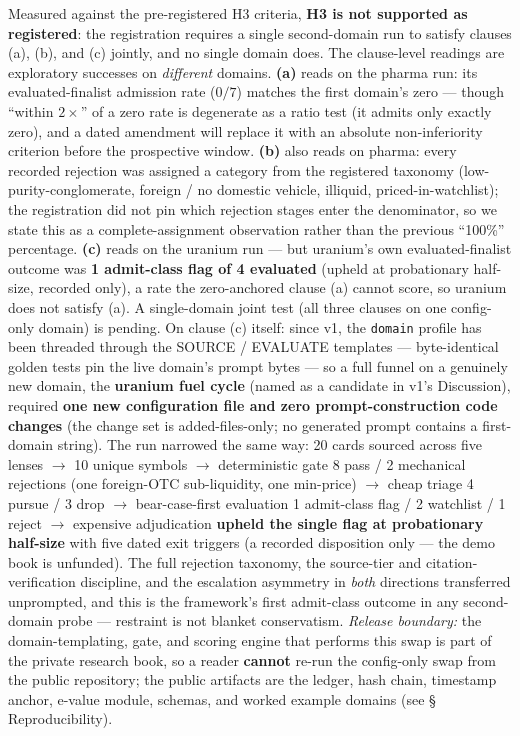 \documentclass[11pt]{article}
\begin{document}
Measured against the pre-registered H3 criteria, \textbf{H3 is not supported as registered}: the
registration requires a single second-domain run to satisfy clauses (a), (b), and (c) jointly, and no
single domain does. The clause-level readings are exploratory successes on \emph{different} domains.
\textbf{(a)} reads on the pharma run: its evaluated-finalist admission rate ($0/7$) matches the first
domain's zero --- though ``within $2\times$'' of a zero rate is degenerate as a ratio test (it admits
only exactly zero), and a dated amendment will replace it with an absolute non-inferiority criterion
before the prospective window. \textbf{(b)} also reads on pharma: every recorded rejection was
assigned a category from the registered taxonomy
(low-purity-conglomerate, foreign / no domestic vehicle, illiquid,
priced-in-watchlist); the registration did not pin which rejection stages enter the denominator, so
we state this as a complete-assignment observation rather than the previous ``100\%'' percentage.
\textbf{(c)} reads on the uranium run --- but uranium's own evaluated-finalist outcome was \textbf{1
admit-class flag of 4 evaluated} (upheld at probationary half-size, recorded only), a rate the
zero-anchored clause (a) cannot score, so uranium does not satisfy (a). A single-domain joint test
(all three clauses on one config-only domain) is pending. On clause (c) itself: since v1, the \texttt{domain}
profile has been threaded through the SOURCE / EVALUATE templates --- byte-identical
golden tests pin the live domain's prompt bytes --- so a full funnel on a genuinely
new domain, the \textbf{uranium fuel cycle} (named as a candidate in v1's Discussion),
required \textbf{one new configuration file and zero prompt-construction code changes}
(the change set is added-files-only; no generated prompt contains a first-domain
string). The run narrowed the same way: 20 cards sourced across five lenses $\to$ 10
unique symbols $\to$ deterministic gate 8 pass / 2 mechanical rejections (one
foreign-OTC sub-liquidity, one min-price) $\to$ cheap triage 4 pursue / 3 drop $\to$
bear-case-first evaluation 1 admit-class flag / 2 watchlist / 1 reject $\to$ expensive
adjudication \textbf{upheld the single flag at probationary half-size} with five dated
exit triggers (a recorded disposition only --- the demo book is unfunded). The full
rejection taxonomy, the source-tier and citation-verification discipline, and the
escalation asymmetry in \emph{both} directions transferred unprompted, and this is the
framework's first admit-class outcome in any second-domain probe --- restraint is not
blanket conservatism. \emph{Release boundary:} the domain-templating, gate, and scoring
engine that performs this swap is part of the private research book, so a reader
\textbf{cannot} re-run the config-only swap from the public repository; the public
artifacts are the ledger, hash chain, timestamp anchor, e-value module, schemas, and
worked example domains (see \S\,Reproducibility).
\end{document}

